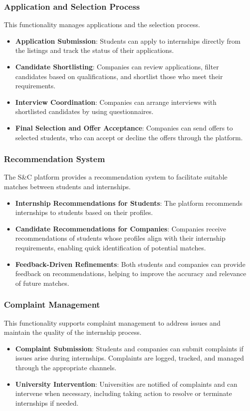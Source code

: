 \subsubsection*{Application and Selection Process} 
This functionality manages applications and the selection process.
\begin{itemize}
    \item \textbf{Application Submission}: Students can apply to internships directly from the listings and track the status of their applications.
    \item \textbf{Candidate Shortlisting}: Companies can review applications, filter candidates based on qualifications, and shortlist those who meet their requirements.
    \item \textbf{Interview Coordination}: Companies can arrange interviews with shortlisted candidates by using questionnaires.
    \item \textbf{Final Selection and Offer Acceptance}: Companies can send offers to selected students, who can accept or decline the offers through the platform.
\end{itemize}

\subsubsection*{Recommendation System} 
The S\&C platform provides a recommendation system to facilitate suitable matches between students and internships.
\begin{itemize}
    \item \textbf{Internship Recommendations for Students}: The platform recommends internships to students based on their profiles.
    \item \textbf{Candidate Recommendations for Companies}: Companies receive recommendations of students whose profiles align with their internship requirements, enabling quick identification of potential matches.
    \item \textbf{Feedback-Driven Refinements}: Both students and companies can provide feedback on recommendations, helping to improve the accuracy and relevance of future matches.
\end{itemize}

\subsubsection*{Complaint Management}
This functionality supports complaint management to address issues and maintain the quality of the internship process.
\begin{itemize}
    \item \textbf{Complaint Submission}: Students and companies can submit complaints if issues arise during internships. Complaints are logged, tracked, and managed through the appropriate channels.
    \item \textbf{University Intervention}: Universities are notified of complaints and can intervene when necessary, including taking action to resolve or terminate internships if needed.
\end{itemize}


